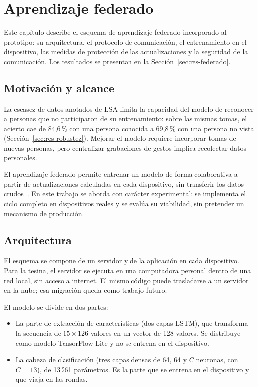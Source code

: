 \chapter{Aprendizaje federado}
\label{cap:federado}

Este capítulo describe el esquema de aprendizaje federado incorporado al prototipo: su arquitectura, el protocolo de comunicación, el entrenamiento en el dispositivo, las medidas de protección de las actualizaciones y la seguridad de la comunicación. Los resultados se presentan en la Sección~\ref{sec:res-federado}.

\section{Motivación y alcance}

La escasez de datos anotados de LSA limita la capacidad del modelo de reconocer a personas que no participaron de su entrenamiento: sobre las mismas tomas, el acierto cae de 84,6\,\% con una persona conocida a 69,8\,\% con una persona no vista (Sección~\ref{sec:res-robustez}). Mejorar el modelo requiere incorporar tomas de nuevas personas, pero centralizar grabaciones de gestos implica recolectar datos personales.

El aprendizaje federado permite entrenar un modelo de forma colaborativa a partir de actualizaciones calculadas en cada dispositivo, sin transferir los datos crudos~\cite{mcmahan2017fedavg}. En este trabajo se aborda con carácter experimental: se implementa el ciclo completo en dispositivos reales y se evalúa su viabilidad, sin pretender un mecanismo de producción.

\section{Arquitectura}

El esquema se compone de un servidor y de la aplicación en cada dispositivo. Para la tesina, el servidor se ejecuta en una computadora personal dentro de una red local, sin acceso a internet. El mismo código puede trasladarse a un servidor en la nube; esa migración queda como trabajo futuro.

El modelo se divide en dos partes:

\begin{itemize}
    \item La parte de extracción de características (dos capas LSTM), que transforma la secuencia de $15 \times 126$ valores en un vector de 128 valores. Se distribuye como modelo TensorFlow Lite y no se entrena en el dispositivo.
    \item La cabeza de clasificación (tres capas densas de 64, 64 y $C$ neuronas, con $C = 13$), de 13\,261 parámetros. Es la parte que se entrena en el dispositivo y que viaja en las rondas.
\end{itemize}

